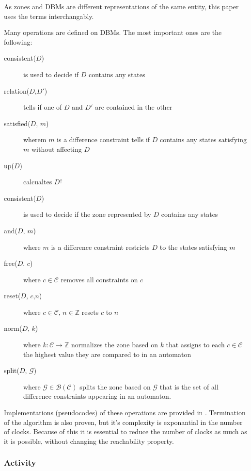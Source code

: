 As zones and DBMs are different representations of the same entity, this paper uses the terms interchangably.

Many operations are defined on DBMs. The most important ones are the following:

\begin{description}
	\item [consistent($D$)] is used to decide if $D$ contains any states
	\item [relation($D$,$D'$)] tells if one of $D$ and $D'$ are contained in the other 
	\item [satisfied($D$, $m$)] wherem $m$ is a difference constraint tells if $D$ contains any states satisfying $m$ without affecting $D$
	\item [up($D$)] calcualtes $D^\uparrow$
	 \item [consistent($D$)] is used to decide if the zone represented by $D$ contains any states
	 \item [and($D$, $m$)] where $m$ is a difference constraint restricts $D$ to the states satisfying $m$
	 \item [free($D$, $c$)] where $c \in \mathcal{C}$  removes all constraints on $c$
	 \item [reset($D$, $c$,$n$)] where $c \in \mathcal{C}$, $n \in \mathds{Z}$  resets $c$ to $n$
	 \item [norm($D$, $k$)] where $k:\mathcal{C} \to \mathds{Z}$ normalizes the zone based on $k$ that assigns to each $c \in \mathcal{C}$ the highest value they are compared to in an automaton
	 \item [split($D$, $\mathcal{G}$)] where $\mathcal{G} \in \mathcal{B}(\mathcal{C})$ splits the zone based on $\mathcal{G}$ that is the set of all difference constraints appearing in an automaton.
\end{description}


Implementations (pseudocodes) of these operations are provided in \cite{bengtsson2004timed}. Termination of the algorithm is also proven, but it's complexity is exponantial in the number of clocks. Because of this it is essential to reduce the number of clocks as much as it is possible, without changing the reachability property.

\subsubsection{Activity}


